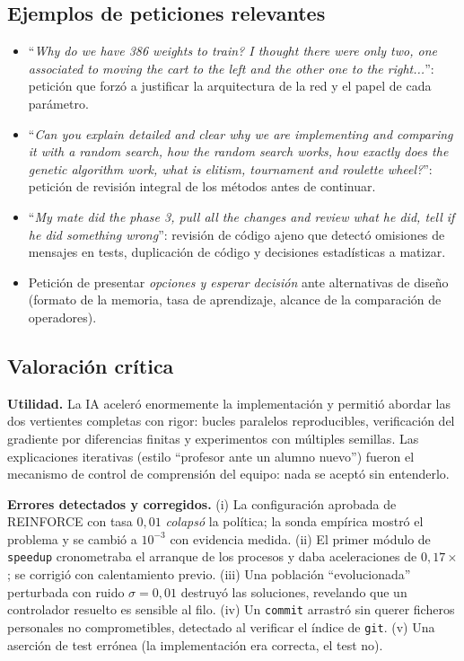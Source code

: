 \subsection{Ejemplos de peticiones relevantes}

\begin{itemize}
  \item ``\emph{Why do we have 386 weights to train? I thought there were only two, one associated to moving the cart to the left and the other one to the right...}'': petición que forzó a justificar la arquitectura de la red y el papel de cada parámetro.
  \item ``\emph{Can you explain detailed and clear why we are implementing and comparing it with a random search, how the random search works, how exactly does the genetic algorithm work, what is elitism, tournament and roulette wheel?}'': petición de revisión integral de los métodos antes de continuar.
  \item ``\emph{My mate did the phase 3, pull all the changes and review what he did, tell if he did something wrong}'': revisión de código ajeno que detectó omisiones de mensajes en tests, duplicación de código y decisiones estadísticas a matizar.
  \item Petición de presentar \emph{opciones y esperar decisión} ante alternativas de diseño (formato de la memoria, tasa de aprendizaje, alcance de la comparación de operadores).
\end{itemize}

\subsection{Valoración crítica}

\textbf{Utilidad.} La IA aceleró enormemente la implementación y permitió abordar las dos vertientes completas con rigor: bucles paralelos reproducibles, verificación del gradiente por diferencias finitas y experimentos con múltiples semillas. Las explicaciones iterativas (estilo ``profesor ante un alumno nuevo'') fueron el mecanismo de control de comprensión del equipo: nada se aceptó sin entenderlo.

\textbf{Errores detectados y corregidos.} (i) La configuración aprobada de REINFORCE con tasa $0{,}01$ \emph{colapsó} la política; la sonda empírica mostró el problema y se cambió a $10^{-3}$ con evidencia medida. (ii) El primer módulo de \texttt{speedup} cronometraba el arranque de los procesos y daba aceleraciones de $0{,}17\times$; se corrigió con calentamiento previo. (iii) Una población ``evolucionada'' perturbada con ruido $\sigma = 0{,}01$ destruyó las soluciones, revelando que un controlador resuelto es sensible al filo. (iv) Un \texttt{commit} arrastró sin querer ficheros personales no comprometibles, detectado al verificar el índice de \texttt{git}. (v) Una aserción de test errónea (la implementación era correcta, el test no).

